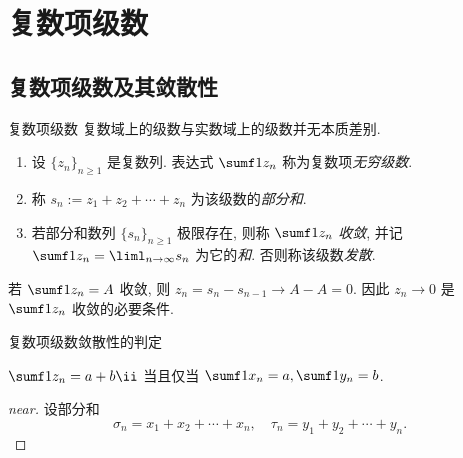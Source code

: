 \section{复数项级数}

\subsection{复数项级数及其敛散性}
\begin{frame}{复数项级数}
	\onslide<+->
	复数域上的级数与实数域上的级数并无本质差别.
	\onslide<+->
	\begin{definition}
		\begin{enumerate}
			\item 设 $\{z_n\}_{n\ge1}$ 是复数列. 表达式 $\sumf1 z_n$ 称为复数项\emph{无穷级数}.
			\item 称 $s_n:=z_1+z_2+\cdots+z_n$ 为该级数的\emph{部分和}.
			\item 若部分和数列 $\{s_n\}_{n\ge 1}$ 极限存在, 则称 $\sumf1 z_n$ \emph{收敛}, 并记 $\sumf1 z_n=\liml_{n\to\infty}s_n$ 为它的\emph{和}. 否则称该级数\emph{发散}.
		\end{enumerate}
	\end{definition}
	\onslide<+->
	若 $\sumf1 z_n=A$ 收敛, 则 $z_n=s_n-s_{n-1}\to A-A=0$.
	\onslide<+->
	因此 \alert{$z_n\to0$ 是 $\sumf1 z_n$ 收敛的必要条件}.
\end{frame}


\begin{frame}{复数项级数敛散性的判定}
	\onslide<+->
	\begin{theorem}[near]
		$\sumf1 z_n=a+b\ii$ 当且仅当 $\sumf1 x_n=a,\sumf1 y_n=b$.
	\end{theorem}
	\onslide<+->
	\begin{proof}[near]
		设部分和
		\[
			\sigma_n=x_1+x_2+\cdots+x_n,\quad
			\tau_n=y_1+y_2+\cdots+y_n.
		\]
		\meddel
	\end{proof}
\end{frame}


